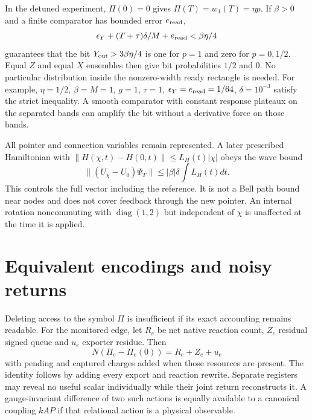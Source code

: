\documentclass[11pt,oneside,openany]{book}
\theoremstyle{definition}
\theoremstyle{remark}\newtheorem{remark}[theorem]{Remark}
\begin{document}
In the detuned experiment, $\Pi(0)=0$ gives $\Pi(T)=w_1(T)=\eta p$.
If $\beta>0$ and a finite comparator has bounded error $e_{
\rm read}$,
\begin{equation}
 \epsilon_Y+(T+\tau)\delta/M+e_{
\rm read}<\beta\eta/4
 \label{acc:precision}
\end{equation}
guarantees that the bit $Y_{
\rm out}>3\beta\eta/4$ is one for $p=1$ and zero for $p=0,1/2$.
Equal $Z$ and equal $X$ ensembles then give bit probabilities $1/2$ and
$0$. No particular distribution inside the nonzero-width ready rectangle
is needed. For example, $\eta=1/2$, $\beta=M=1$, $g=1$, $\tau=1$,
$\epsilon_Y=e_{
\rm read}=1/64$, $\delta=10^{-3}$ satisfy the strict inequality.
A smooth comparator with constant response plateaux on the separated
bands can amplify the bit without a derivative force on those bands.

All pointer and connection variables remain represented. A later prescribed
Hamiltonian with
$\|H(\chi,t)-H(0,t)\|\le L_H(t)|\chi|$ obeys the wave bound
\[
 \|(U_\chi-U_0)\Psi_T\|\le|\beta|\delta\int L_H(t)dt.
\]
This controls the full vector including the reference. It is not a Bell
path bound near nodes and does not cover feedback through the new pointer.
An internal rotation noncommuting with $\operatorname{diag}(1,2)$ but
independent of $\chi$ is unaffected at the time it is applied.

\section{Equivalent encodings and noisy returns}
Deleting access to the symbol $\Pi$ is insufficient if its exact accounting
remains readable. For the monitored edge, let $R_e$ be net native reaction
count, $Z_e$ residual signed queue and $u_e$ exporter residue. Then
\begin{equation}
 N(\Pi_e-\Pi_e(0))=R_e+Z_e+u_e
 \label{acc:ledger}
\end{equation}
with pending and captured charges added when those resources are present.
The identity follows by adding every export and reaction rewrite.
Separate registers may reveal no useful scalar individually while their
joint return reconstructs it. A gauge-invariant difference of two such
actions is equally available to a canonical coupling $kA P$ if that
relational action is a physical observable.
\end{document}
